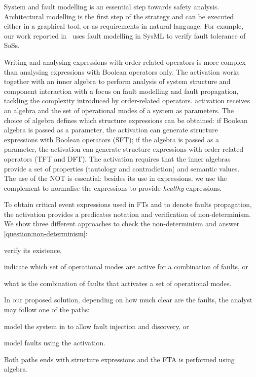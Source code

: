 System and fault modelling is an essential step towards safety analysis.
Architectural modelling is the first step of the strategy and can be executed either in a graphical tool, or as requirements in natural language.
For example, our work reported in~\cite{APR+2013,ADP+2013} uses fault modelling in \ac{SysML} to verify fault tolerance of \acp{SoS}.

Writing and analysing expressions with order-related operators is more complex than analysing expressions with Boolean operators only.
The \ac{activation} works together with an inner algebra to perform analysis of system structure and component interaction with a focus on fault modelling and fault propagation, tackling the complexity introduced by order-related operators.
\ac{activation} receives an algebra and the set of operational modes of a system as parameters.
The choice of algebra defines which structure expressions can be obtained: if Boolean algebra is passed as a parameter, the \ac{activation} can generate structure expressions with Boolean operators (\ac{SFT}); if the \ac{algebra} is passed as a parameter, the \ac{activation} can generate structure expressions with order-related operators (\ac{TFT} and \ac{DFT}).
The \ac{activation} requires that the inner algebras provide a set of properties (tautology and contradiction) and semantic values.
The use of the \ac{NOT} is essential: besides its use in expressions, we use the complement to normalise the expressions to provide \emph{healthy} expressions.

To obtain critical event expressions used in \acp{FT} and to denote faults propagation, the \ac{activation} provides a predicates notation and verification of non-determinism. 
We show three different approaches to check the non-determinism and answer \cref{question:non-determinism}: 
\begin{alineasinline}
  \item verify its existence, 
  \item indicate which set of operational modes are active for a combination of faults, or 
  \item what is the combination of faults that activates a set of operational modes.
\end{alineasinline}

In our proposed solution, depending on how much clear are the faults, the analyst may follow one of the paths: 
\begin{alineasinline}
  \item model the system in \simulink to allow fault injection and discovery, or 
  \item model faults using the \acl{activation}.
\end{alineasinline}
%
Both paths ends with structure expressions and the \ac{FTA} is performed using \ac{algebra}.


